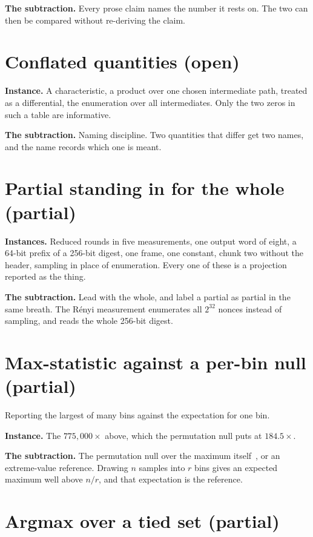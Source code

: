 \textbf{The subtraction.} Every prose claim names the number it rests on. The two can then be compared without re-deriving the claim.

\section{Conflated quantities (open)}

\textbf{Instance.} A characteristic, a product over one chosen intermediate path, treated as a differential, the enumeration over all intermediates. Only the two zeros in such a table are informative.

\textbf{The subtraction.} Naming discipline. Two quantities that differ get two names, and the name records which one is meant.

\section{Partial standing in for the whole (partial)}

\textbf{Instances.} Reduced rounds in five measurements, one output word of eight, a 64-bit prefix of a 256-bit digest, one frame, one constant, chunk two without the header, sampling in place of enumeration. Every one of these is a projection reported as the thing.

\textbf{The subtraction.} Lead with the whole, and label a partial as partial in the same breath. The Rényi measurement enumerates all \(2^{32}\) nonces instead of sampling, and reads the whole 256-bit digest.

\section{Max-statistic against a per-bin null (partial)}

Reporting the largest of many bins against the expectation for one bin.

\textbf{Instance.} The \(775{,}000\times\) above, which the permutation null puts at \(184.5\times\).

\textbf{The subtraction.} The permutation null over the maximum itself~\cite{src:Westfall-and-Young-1993}, or an extreme-value reference. Drawing \(n\) samples into \(r\) bins gives an expected maximum well above \(n/r\), and that expectation is the reference.

\section{Argmax over a tied set (partial)}

